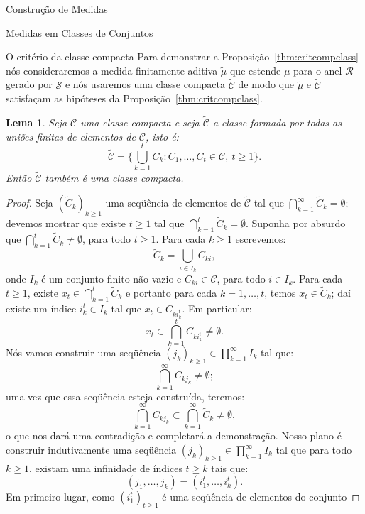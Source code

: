 \documentclass[oneside,final,11pt]{amsbook}
\theoremstyle{remark}\newtheorem{exercise}{Exercício}[chapter]
\theoremstyle{remark}\newtheorem{*exercise}[exercise]{\hbox to 0pt{\hskip 0pt minus 1fil*}Exercício}
\theoremstyle{definition}\newtheorem{exdefin}{Definição}[chapter]
\theoremstyle{plain}\newtheorem{teo}{Teorema}[section]
\theoremstyle{plain}\newtheorem{lem}[teo]{Lema}
\theoremstyle{plain}\newtheorem{prop}[teo]{Proposição}
\theoremstyle{plain}\newtheorem{cor}[teo]{Corolário}
\theoremstyle{definition}\newtheorem{defin}[teo]{Definição}
\theoremstyle{remark}\newtheorem{rem}[teo]{Observação}
\theoremstyle{definition}\newtheorem{notation}[teo]{Notação}
\theoremstyle{definition}\newtheorem{convention}[teo]{Convenção}
\theoremstyle{definition}\newtheorem{example}[teo]{Exemplo}
\numberwithin{section}{chapter}
\numberwithin{equation}{section}
\begin{document}
\begin{chapter}{Construção de Medidas}
\begin{section}{Medidas em Classes de Conjuntos}
\begin{subsection}{O critério da classe compacta}
Para demonstrar a Proposição~\ref{thm:critcompclass} nós consideraremos a medida finitamente
aditiva $\tilde\mu$ que estende $\mu$ para o anel $\mathcal R$ gerado por $\mathcal S$
e nós usaremos uma classe compacta $\widetilde{\mathcal C}$ de modo que $\tilde\mu$
e $\widetilde{\mathcal C}$ satisfaçam as hipóteses da Proposição~\ref{thm:critcompclass}.
\begin{lem}\label{thm:Cftambemcompacta}
Seja $\mathcal C$ uma classe compacta e seja $\widetilde{\mathcal C}$ a classe formada por
todas as uniões finitas de elementos de $\mathcal C$, isto é:
\[\widetilde{\mathcal C}=\Big\{\bigcup_{k=1}^tC_k:C_1,\ldots,C_t\in\mathcal C,\ t\ge1\Big\}.\]
Então $\widetilde{\mathcal C}$ também é uma classe compacta.
\end{lem}
\begin{proof}
Seja $(\widetilde C_k)_{k\ge1}$ uma seqüência de elementos de $\widetilde{\mathcal C}$
tal que $\bigcap_{k=1}^\infty\widetilde C_k=\emptyset$; devemos mostrar que existe $t\ge1$ tal que
$\bigcap_{k=1}^t\widetilde C_k=\emptyset$. Suponha por absurdo que $\bigcap_{k=1}^t\widetilde C_k\ne\emptyset$,
para todo $t\ge1$. Para cada $k\ge1$ escrevemos:
\[\widetilde C_k=\bigcup_{i\in I_k}C_{ki},\]
onde $I_k$ é um conjunto finito não vazio e $C_{ki}\in\mathcal C$, para todo $i\in I_k$.
Para cada $t\ge1$, existe $x_t\in\bigcap_{k=1}^t\widetilde C_k$ e portanto
para cada $k=1,\ldots,t$, temos $x_t\in\widetilde C_k$; daí existe um índice
$i^t_k\in I_k$ tal que $x_t\in C_{ki^t_k}$. Em particular:
\begin{equation}\label{eq:xtestala}
x_t\in\bigcap_{k=1}^tC_{ki^t_k}\ne\emptyset.
\end{equation}
Nós vamos construir uma seqüência $(j_k)_{k\ge1}\in\prod_{k=1}^\infty I_k$ tal que:
\[\bigcap_{k=1}^\infty C_{kj_k}\ne\emptyset;\]
uma vez que essa seqüência esteja construída, teremos:
\begin{equation}\label{eq:classecomcontr}
\bigcap_{k=1}^\infty C_{kj_k}\subset\bigcap_{k=1}^\infty\widetilde C_k\ne\emptyset,
\end{equation}
o que nos dará uma contradição e completará a demonstração. Nosso plano é construir
indutivamente uma seqüência $(j_k)_{k\ge1}\in\prod_{k=1}^\infty I_k$ tal que para todo
$k\ge1$, existam uma infinidade de índices $t\ge k$ tais que:
\begin{equation}\label{eq:forinfmanyt}
(j_1,\ldots,j_k)=(i^t_1,\ldots,i^t_k).
\end{equation}
Em primeiro lugar, como $(i^t_1)_{t\ge1}$ é uma seqüência de elementos do conjunto

\end{proof}
\end{subsection}
\end{section}
\end{chapter}
\end{document}
